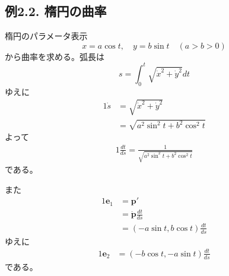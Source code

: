 \documentclass[a4j,disablejfam,dvipdfmx,papersize,slide,uplatex,21pt]{jsarticle}
\begin{document}
\newpage
\subsection*{例2.2. 楕円の曲率}
楕円のパラメータ表示
\begin{equation}
    x = a \cos t,\quad y = b \sin t \quad (a > b > 0)
\end{equation}
から曲率を求める。弧長は
\begin{equation}
    s = \int_0^t \sqrt{\dot{x}^2 + \dot{y}^2} dt
\end{equation}
ゆえに
\begin{alignat}{1}
    \dot{s} &= \sqrt{\dot{x}^2 + \dot{y}^2} \\
        &= \sqrt{a^2 \sin^2 t + b^2 \cos^2 t}
\end{alignat}
よって
\begin{alignat}{1}
    \frac{dt}{ds} = \frac{1}{\sqrt{a^2 \sin^2 t + b^2 \cos^2 t}}
\end{alignat}
である。

\newpage
また
\begin{alignat}{1}
    \bm{e}_1 &= \bm{p}' \\
        &= \dot{\bm{p}} \frac{dt}{ds} \\
        &= (-a \sin t, b \cos t) \frac{dt}{ds}
\end{alignat}
ゆえに
\begin{alignat}{1}
    \bm{e}_2 &= (-b \cos t, -a \sin t) \frac{dt}{ds}
\end{alignat}
である。
\end{document}
